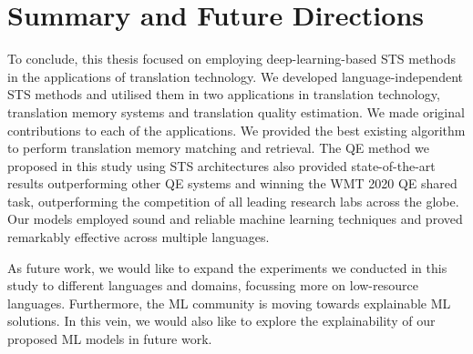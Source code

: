 \section{Summary and Future Directions}
To conclude, this thesis focused on employing deep-learning-based STS methods in the applications of translation technology. We developed language-independent STS methods and utilised them in two applications in translation technology, translation memory systems and translation quality estimation. We made original contributions to each of the applications. We provided the best existing algorithm to perform translation memory matching and retrieval. The QE method we proposed in this study using STS architectures also provided state-of-the-art results outperforming other QE systems and winning the WMT 2020 QE shared task, outperforming the competition of all leading research labs across the globe. Our models employed sound and reliable machine learning techniques and proved remarkably effective across multiple languages.

As future work, we would like to expand the experiments we conducted in this study to different languages and domains, focussing more on low-resource languages. Furthermore, the ML community is moving towards explainable ML solutions. In this vein, we would also like to explore the explainability of our proposed ML models in future work.